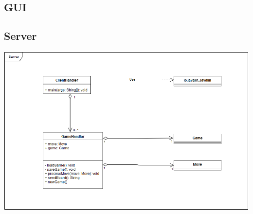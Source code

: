 \documentclass[parskip=full]{scrartcl}
\begin{document}
		\subsection{GUI}
		
		\newpage
		\subsection{Server}
		\begin{minipage}{\linewidth}
			\centering
			\includegraphics[width=1\linewidth]{Diagramme/Server}
			\label{fig:server}
		\end{minipage}
\end{document}
